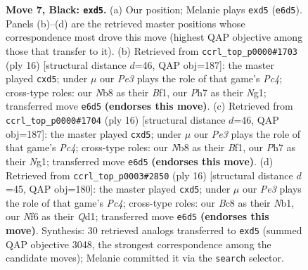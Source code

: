 \documentclass[11pt]{article}
\begin{document}
\begin{figure}[p]
\caption{\textbf{Move 7, Black: \texttt{exd5}.} (a) Our position; Melanie plays \texttt{exd5} (\texttt{e6d5}). Panels (b)--(d) are the retrieved master positions whose correspondence most drove this move (highest QAP objective among those that transfer to it). (b) Retrieved from \texttt{ccrl\_top\_p0000\#1703} (ply 16) [structural distance $d$=46, QAP obj=187]: the master played \texttt{cxd5}; under $\mu$ our \emph{Pe3} plays the role of that game's \emph{Pc4}; cross-type roles: our \emph{N}b8 as their \emph{B}f1, our \emph{P}h7 as their \emph{N}g1; transferred move \texttt{e6d5} \textbf{(endorses this move)}. (c) Retrieved from \texttt{ccrl\_top\_p0000\#1704} (ply 16) [structural distance $d$=46, QAP obj=187]: the master played \texttt{cxd5}; under $\mu$ our \emph{Pe3} plays the role of that game's \emph{Pc4}; cross-type roles: our \emph{N}b8 as their \emph{B}f1, our \emph{P}h7 as their \emph{N}g1; transferred move \texttt{e6d5} \textbf{(endorses this move)}. (d) Retrieved from \texttt{ccrl\_top\_p0003\#2850} (ply 16) [structural distance $d$=45, QAP obj=180]: the master played \texttt{cxd5}; under $\mu$ our \emph{Pe3} plays the role of that game's \emph{Pc4}; cross-type roles: our \emph{B}c8 as their \emph{N}b1, our \emph{N}f6 as their \emph{Q}d1; transferred move \texttt{e6d5} \textbf{(endorses this move)}. Synthesis: 30 retrieved analogs transferred to \texttt{exd5} (summed QAP objective 3048, the strongest correspondence among the candidate moves); Melanie committed it via the \texttt{search} selector.}
\label{fig:thought-m13}
\end{figure}

\clearpage
\end{document}
